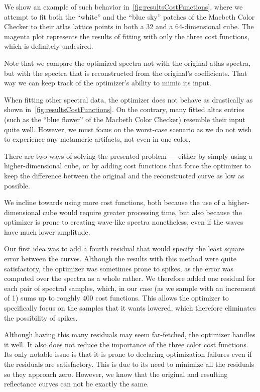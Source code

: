 We show an example of such behavior in~\cref{fig:resultsCostFunctions}, where we attempt to fit both the ``white'' and the ``blue sky'' patches of the Macbeth Color Checker to their atlas lattice points in both a 32 and a 64-dimensional cube. The magenta plot represents the results of fitting with only the three cost functions, which is definitely undesired.

Note that we compare the optimized spectra not with the original atlas spectra, but with the spectra that is reconstructed from the original's coefficients. That way we can keep track of the optimizer's ability to mimic its input.

When fitting other spectral data, the optimizer does not behave as drastically as shown in~\cref{fig:resultsCostFunctions}. On the contrary, many fitted altas entries (such as the ``blue flower'' of the Macbeth Color Checker) resemble their input quite well. However, we must focus on the worst-case scenario as we do not wish to experience any metameric artifacts, not even in one color.

There are two ways of solving the presented problem --- either by simply using a higher-dimensional cube, or by adding cost functions that force the optimizer to keep the difference between the original and the reconstructed curve as low as possible.

We incline towards using more cost functions, both because the use of a higher-dimensional cube would require greater processing time, but also because the optimizer is prone to creating wave-like spectra nonetheless, even if the waves have much lower amplitude.

Our first idea was to add a fourth residual that would specify the least square error between the curves. Although the results with this method were quite satisfactory, the optimizer was sometimes prone to spikes, as the error was computed over the spectra as a whole rather. We therefore added one residual for each pair of spectral samples, which, in our case (as we sample with an increment of 1) sums up to roughly 400 cost functions. This allows the optimizer to specifically focus on the samples that it wants lowered, which therefore eliminates the possibility of spikes.

Although having this many residuals may seem far-fetched, the optimizer handles it well. It also does not reduce the importance of the three color cost functions. Its only notable issue is that it is prone to declaring optimization failures even if the residuals are satisfactory. This is due to its need to minimize all the residuals so they approach zero. However, we know that the original and resulting reflectance curves can not be exactly the same.

